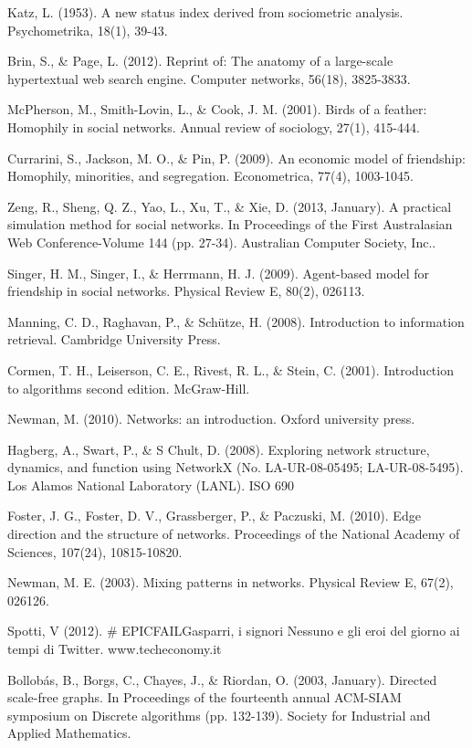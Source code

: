 \documentclass[a4paper,12pt]{article}
\begin{document}
\begin{thebibliography}{9}
  Katz, L. (1953). A new status index derived from sociometric analysis. Psychometrika, 18(1), 39-43.

  Brin, S., \& Page, L. (2012). Reprint of: The anatomy of a large-scale hypertextual web search engine. Computer networks, 56(18), 3825-3833.

  McPherson, M., Smith-Lovin, L., \& Cook, J. M. (2001). Birds of a feather: Homophily in social networks. Annual review of sociology, 27(1), 415-444.
  
  Currarini, S., Jackson, M. O., \& Pin, P. (2009). An economic model of friendship: Homophily, minorities, and segregation. Econometrica, 77(4), 1003-1045.
  
  Zeng, R., Sheng, Q. Z., Yao, L., Xu, T., \& Xie, D. (2013, January). A practical simulation method for social networks. In Proceedings of the First Australasian Web Conference-Volume 144 (pp. 27-34). Australian Computer Society, Inc..
  
  Singer, H. M., Singer, I., \& Herrmann, H. J. (2009). Agent-based model for friendship in social networks. Physical Review E, 80(2), 026113.

  Manning, C. D., Raghavan, P., \& Schütze, H. (2008). Introduction to information retrieval. Cambridge University Press.
  
  Cormen, T. H., Leiserson, C. E., Rivest, R. L., \& Stein, C. (2001). Introduction to algorithms second edition. McGraw-Hill.
  
  Newman, M. (2010). Networks: an introduction. Oxford university press.
  
  Hagberg, A., Swart, P., \& S Chult, D. (2008). Exploring network structure, dynamics, and function using NetworkX (No. LA-UR-08-05495; LA-UR-08-5495). Los Alamos National Laboratory (LANL).
ISO 690	

  Foster, J. G., Foster, D. V., Grassberger, P., \& Paczuski, M. (2010). Edge direction and the structure of networks. Proceedings of the National Academy of Sciences, 107(24), 10815-10820.
  
  Newman, M. E. (2003). Mixing patterns in networks. Physical Review E, 67(2), 026126.
  
  Spotti, V (2012). \# EPICFAILGasparri, i signori Nessuno e gli eroi del giorno ai tempi di Twitter. www.techeconomy.it
  
  Bollobás, B., Borgs, C., Chayes, J., \& Riordan, O. (2003, January). Directed scale-free graphs. In Proceedings of the fourteenth annual ACM-SIAM symposium on Discrete algorithms (pp. 132-139). Society for Industrial and Applied Mathematics.
\end{thebibliography}
\end{document}
